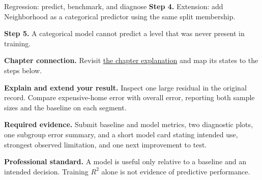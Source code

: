 \begin{labproject}{Regression: predict, benchmark, and diagnose}
\noindent\textbf{Step 4.} Extension: add Neighborhood as a categorical predictor using the same split membership.


\noindent\textbf{Step 5.} A categorical model cannot predict a level that was never present in training.

\textbf{Chapter connection.} Revisit \hyperref[ch:regression]{the chapter explanation} and map its states to the steps below.


\begin{verification}
\textbf{Explain and extend your result.} Inspect one large residual in the original record. Compare expensive-home error with overall error, reporting both sample sizes and the baseline on each segment.


\textbf{Required evidence.} Submit baseline and model metrics, two diagnostic plots, one subgroup error summary, and a short model card stating intended use, strongest observed limitation, and one next improvement to test.

\textbf{Professional standard.} A model is useful only relative to a baseline and an intended decision. Training $R^2$ alone is not evidence of predictive performance.
\end{verification}
\end{labproject}
